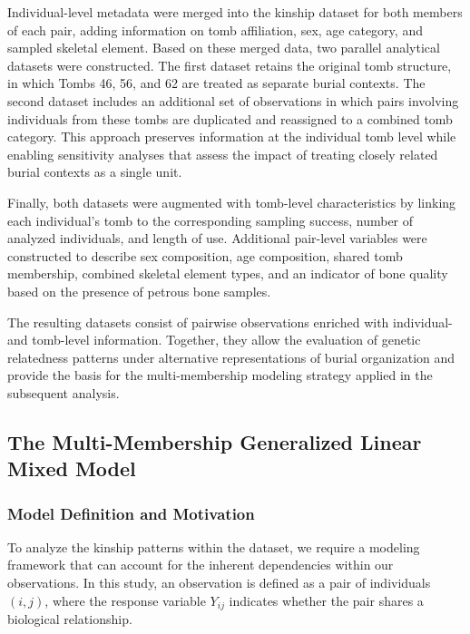 \documentclass[
]{ajs}
\begin{document}
Individual-level metadata were merged into the kinship dataset for both
members of each pair, adding information on tomb affiliation, sex, age
category, and sampled skeletal element. Based on these merged data, two
parallel analytical datasets were constructed. The first dataset retains
the original tomb structure, in which Tombs 46, 56, and 62 are treated
as separate burial contexts. The second dataset includes an additional
set of observations in which pairs involving individuals from these
tombs are duplicated and reassigned to a combined tomb category. This
approach preserves information at the individual tomb level while
enabling sensitivity analyses that assess the impact of treating closely
related burial contexts as a single unit.

Finally, both datasets were augmented with tomb-level characteristics by
linking each individual's tomb to the corresponding sampling success,
number of analyzed individuals, and length of use. Additional pair-level
variables were constructed to describe sex composition, age composition,
shared tomb membership, combined skeletal element types, and an
indicator of bone quality based on the presence of petrous bone samples.

The resulting datasets consist of pairwise observations enriched with
individual- and tomb-level information. Together, they allow the
evaluation of genetic relatedness patterns under alternative
representations of burial organization and provide the basis for the
multi-membership modeling strategy applied in the subsequent analysis.

\subsection{The Multi-Membership Generalized Linear Mixed
Model}\label{the-multi-membership-generalized-linear-mixed-model}

\subsubsection{Model Definition and
Motivation}\label{model-definition-and-motivation}

To analyze the kinship patterns within the dataset, we require a
modeling framework that can account for the inherent dependencies within
our observations. In this study, an observation is defined as a pair of
individuals \((i,j)\), where the response variable \(Y_{ij}\) indicates
whether the pair shares a biological relationship.
\end{document}
